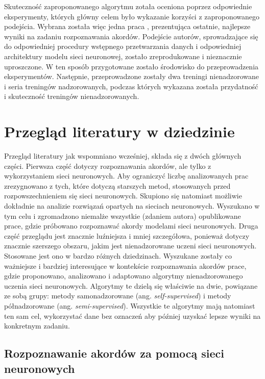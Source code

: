 Skuteczność zaproponowanego algorytmu zotała oceniona poprzez odpowiednie eksperymenty, których główny celem było wykazanie korzyści z zaproponowanego podejścia. Wybrana została więc jedna praca \cite{park_bi-directional_2019}, prezentująca ostatnie, najlepsze wyniki na zadaniu rozpoznawania akordów. Podejście autorów, sprowadzające się do odpowiedniej procedury wstępnego przetwarzania danych i odpowiedniej architektury modelu sieci neuronowej, zostało zreprodukowane i nieznacznie uproszczone. W ten sposób przygotowane zostało środowisko do przeprowadzenia eksperymentów. Następnie, przeprowadzone zostały dwa treningi nienadzorowane i seria treningów nadzorowanych, podczas których wykazana została przydatność i skuteczność treningów nienadzorowanych.



\section{Przegląd literatury w dziedzinie}

Przegląd literatury jak wspomniano wcześniej, składa się z dwóch głównych części. Pierwsza część dotyczy rozpoznawania akordów, ale tylko z wykorzystaniem sieci neuronowych. Aby ograniczyć liczbę analizowanych prac zrezygnowano z tych, które dotyczą starszych metod, stosowanych przed rozpowszechnieniem się sieci neuronowych. Skupiono się natomiast możliwie dokładnie na analizie rozwiązań opartych na sieciach neuronowych. Wyszukano w tym celu i zgromadzono niemalże wszystkie (zdaniem autora) opublikowane prace, gdzie próbowano rozpoznawać akordy modelami sieci neuronowych. Druga część przeglądu jest znacznie luźniejsza i mniej szczegółowa, ponieważ dotyczy znacznie szerszego obszaru, jakim jest nienadzorowane uczeni sieci neuronowych. Stosowane jest ono w bardzo różnych dziedzinach. Wyszukane zostały co ważniejsze i bardziej interesujące w kontekście rozpoznawania akordów prace, gdzie proponowano, analizowano i adaptowano algorytmy nienadzorowanego uczenia sieci neuronowych. Algorytmy te dzielą się właściwie na dwie, powiązane ze sobą grupy: metody samonadzorowane (ang. \emph{self-supervised}) i metody półnadzorowane (ang. \emph{semi-supervised}). Wszystkie te algorytmy mają natomiast ten sam cel, wykorzystać dane bez oznaczeń aby później uzyskać lepsze wyniki na konkretnym zadaniu.

\subsection{Rozpoznawanie akordów za pomocą sieci neuronowych}

